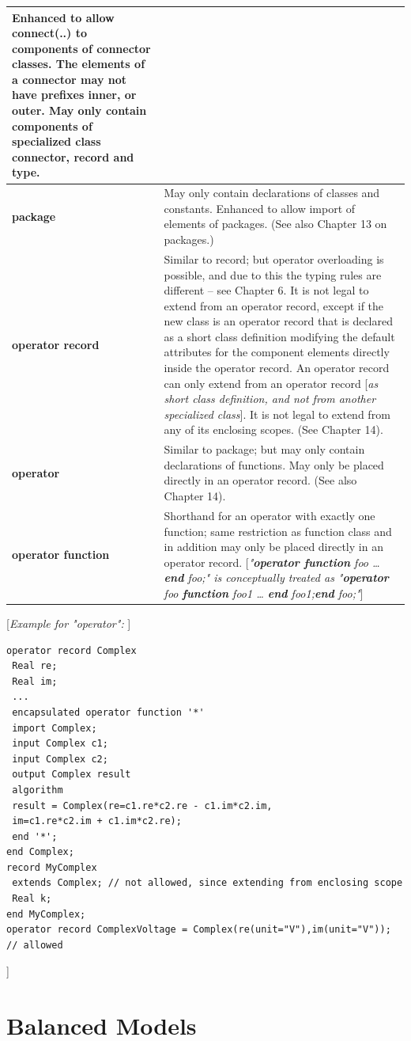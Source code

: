 \documentclass[10pt,a4paper]{report}
\def\Mcomment#1{{[}\emph{#1}{]}}
\def\Mcommentend#1{\emph{#1}{]}}
\def\doublelabel#1{\label{#1}\hypertarget{#1}{}}
\begin{document}
\begin{longtable}{|p{4cm}|p{7cm}|}
Enhanced to allow connect(..) to components of connector classes. The
elements of a connector may not have prefixes inner, or outer. May only
contain components of specialized class connector, record and
type.\\ \hline
\textbf{package} & May only contain declarations of classes and
constants. Enhanced to allow import of elements of packages. (See also
Chapter 13 on packages.)\\ \hline
\textbf{operator record} & Similar to record; but operator overloading
is possible, and due to this the typing rules are different -- see
Chapter 6. It is not legal to extend from an operator record, except if
the new class is an operator record that is declared as a short class
definition modifying the default attributes for the component elements
directly inside the operator record. An operator record can only extend
from an operator record \Mcomment{as short class definition, and not from
another specialized class}. It is not legal to extend from any of its
enclosing scopes. (See Chapter 14).\\ \hline
\textbf{operator} & Similar to package; but may only contain
declarations of functions. May only be placed directly in an operator
record. (See also Chapter 14).\\ \hline
\textbf{operator function} &  Shorthand for an
operator with exactly one function; same restriction as function class
and in addition may only be placed directly in an operator
record. \Mcomment{"\textbf{operator function} foo \ldots{}
\textbf{end} foo;" is conceptually treated as
"\textbf{operator} foo \textbf{function} foo1 \ldots{} \textbf{end}
foo1;\textbf{end} foo;"}\\ \hline
\end{longtable}

\Mcomment{Example for "operator": }
\begin{lstlisting}[language=modelica]
operator record Complex
 Real re;
 Real im;
 ...
 encapsulated operator function '*'
 import Complex;
 input Complex c1;
 input Complex c2;
 output Complex result
 algorithm
 result = Complex(re=c1.re*c2.re - c1.im*c2.im, 
 im=c1.re*c2.im + c1.im*c2.re);
 end '*';
end Complex;
record MyComplex
 extends Complex; // not allowed, since extending from enclosing scope
 Real k;
end MyComplex;
operator record ComplexVoltage = Complex(re(unit="V"),im(unit="V")); // allowed
\end{lstlisting}
\Mcommentend{}



\section{Balanced Models}\doublelabel{balanced-models}
\end{document}
